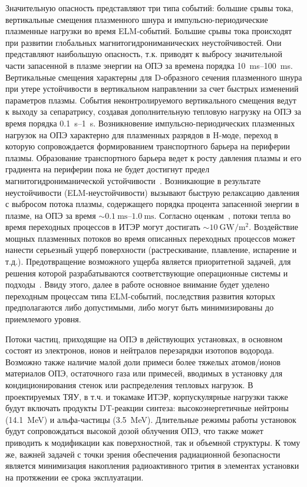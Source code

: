 Значительную опасность представляют три типа событий: большие срывы тока, вертикальные смещения плазменного шнура и импульсно-периодические плазменные нагрузки во время ELM-событий. Большие срывы тока происходят при развитии глобальных магнитогидрониманических неустойчивостей. Они представляют наибольшую опасность, т.к. приводят к выбросу значительной части запасенной в плазме энергии на ОПЭ за времена порядка \SIrange{10}{100}{\milli\second}. Вертикальные смещения характерны для D-образного сечения плазменного шнура при утере устойчивости в вертикальном направлении за счет быстрых изменений параметров плазмы. События неконтролируемого вертикального смещения ведут к выходу за сепаратрису, создавая дополнительную тепловую нагрузку на ОПЭ за время порядка \SIrange{0.1}{1}{\second}. Возникновение импульсно-периодических плазменных нагрузок на ОПЭ характерно для плазменных разрядов в H-моде, переход в которую сопровождается формированием транспортного барьера на периферии плазмы. Образование транспортного барьера ведет к росту давления плазмы и его градиента на периферии пока не будет достигнут предел магнитогидрониманической устойчивости~\cite{Leonard2014}. Возникающие в результате неустойчивости (ELM-неустойчивости) вызывают быструю релаксацию давления с выбросом потока плазмы, содержащего порядка процента запасенной энергии в плазме, на ОПЭ за время \( \sim\SIrange{0.1}{1.0}{\milli\second} \). Согласно оценкам~\cite{Loarte2003, hender2007mhd, Pitts2017, Pitts2019}, потоки тепла во время переходных процессов в ИТЭР могут достигать $\sim\SI{10}{\giga\watt\per\meter\squared}$. Воздействие мощных плазменных потоков во время описанных переходных процессов может нанести серьезный ущерб поверхности (растрескивание, плавление, испарение и т.д.). Предотвращение возможного ущерба является приоритетной задачей, для решения которой разрабатываются соответствующие операционные системы и подходы~\cite{Lang2013,Evans2013,Lehnen2015}. Ввиду этого, далее в работе основное внимание будет уделено переходным процессам типа ELM-событий, последствия развития которых предполагаются либо допустимыми, либо могут быть минимизированы до приемлемого уровня.

Потоки частиц, приходящие на ОПЭ в действующих установках, в основном состоят из электронов, ионов и нейтралов перезарядки изотопов водорода. Возможно также наличие малой доли примеси более тяжелых атомов/ионов материалов ОПЭ, остаточного газа или примесей, вводимых в установку для кондиционирования стенок или распределения тепловых нагрузок. В проектируемых ТЯУ, в т.ч. и токамаке ИТЭР, корпускулярные нагрузки также будут включать продукты DT-реакции синтеза: высокоэнергетичные нейтроны (\SI{14.1}{\mega\electronvolt}) и альфа-частицы (\SI{3.5}{\mega\electronvolt}). Длительные режимы работы установок будут сопровождаться высокой дозой облучения ОПЭ, что также может приводить к модификации как поверхностной, так и объемной структуры. К тому же, важней задачей с точки зрения обеспечения радиационной безопасности является минимизация накопления радиоактивного трития в элементах установки на протяжении ее срока эксплуатации.

